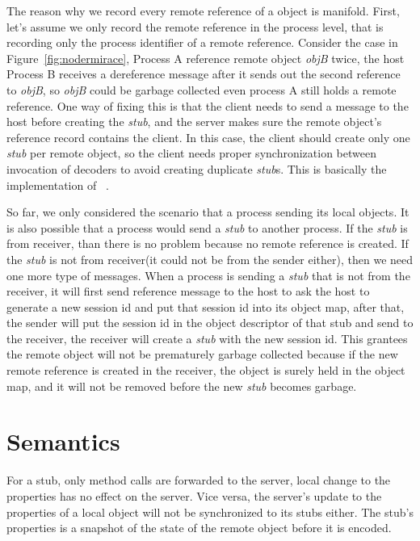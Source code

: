 \nodrmiracefig{}

The reason why we record every remote reference of a object is manifold.
First, let's assume we only record the remote reference in the process level,
that is recording only the process identifier of a remote reference.
Consider the case in Figure~\ref{fig:nodermirace},
Process A reference remote object \emph{objB} twice,
the host Process B receives a dereference message
after it sends out the second reference to \emph{objB},
so \emph{objB} could be garbage collected even process A still holds a remote
reference.
One way of fixing this is that
the client needs to send a message to the host before creating the \emph{stub},
and the server makes sure the remote object's reference record contains the client.
In this case, the client should create only one \emph{stub} per remote object,
so the client needs proper synchronization between invocation of decoders to
avoid creating duplicate \emph{stub}s. This is basically the implementation
of ~\cite{birrell1993distributed}. %


So far, we only considered the scenario that a process sending its local
objects.
It is also possible that a process would send a \emph{stub} to another process.
If the \emph{stub} is from receiver, than there is no problem because no remote
reference is created.
If the \emph{stub} is not from receiver(it could not be from the sender either),
then we need one more type of messages.
When a process is sending a \emph{stub} that is not from the receiver,
it will first send reference message to the host to ask the host
to generate a new session id and put that session id into its object map,
after that, the sender will put the session id in the object descriptor of that
stub and send to the receiver,
the receiver will create a \emph{stub} with the new session id.
This grantees the remote object will not be prematurely garbage collected
because if the new remote reference is created in the receiver,
the object is surely held in the object map,
and it will not be removed before the new \emph{stub} becomes garbage.


\section{Semantics}
For a stub, only method calls are forwarded to the server,
local change to the properties has no effect on the server.
Vice versa, the server's update to the properties of a local object will 
not be synchronized to its stubs either.
The stub's properties is a snapshot of the state of 
the remote object before it is encoded.

